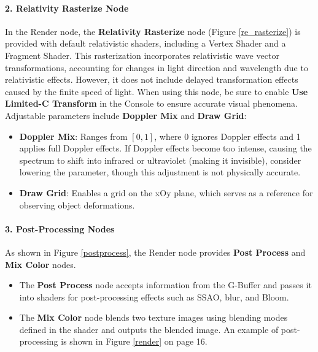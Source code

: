 \documentclass{article}
\begin{document}
\paragraph{2. Relativity Rasterize Node}
In the Render node, the \textbf{Relativity Rasterize} node (Figure \ref{re_rasterize}) is provided with default relativistic shaders, including a Vertex Shader and a Fragment Shader. This rasterization incorporates relativistic wave vector transformations, accounting for changes in light direction and wavelength due to relativistic effects. However, it does not include delayed transformation effects caused by the finite speed of light. When using this node, be sure to enable \textbf{Use Limited-C Transform} in the Console to ensure accurate visual phenomena. Adjustable parameters include \textbf{Doppler Mix} and \textbf{Draw Grid}:
\begin{itemize}
    \item \textbf{Doppler Mix}: Ranges from $[0,1]$, where 0 ignores Doppler effects and 1 applies full Doppler effects. If Doppler effects become too intense, causing the spectrum to shift into infrared or ultraviolet (making it invisible), consider lowering the parameter, though this adjustment is not physically accurate.
    \item \textbf{Draw Grid}: Enables a grid on the xOy plane, which serves as a reference for observing object deformations.
\end{itemize}

\paragraph{3. Post-Processing Nodes}
As shown in Figure \ref{postprocess}, the Render node provides \textbf{Post Process} and \textbf{Mix Color} nodes. 
\begin{itemize}
    \item The \textbf{Post Process} node accepts information from the G-Buffer and passes it into shaders for post-processing effects such as SSAO, blur, and Bloom.
    \item The \textbf{Mix Color} node blends two texture images using blending modes defined in the shader and outputs the blended image. An example of post-processing is shown in Figure \ref{render} on page 16.
\end{itemize}
\end{document}
